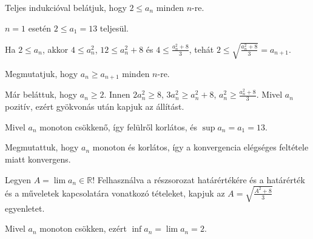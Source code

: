 \documentclass[11pt]{scrartcl}
\begin{document}
Teljes indukcióval belátjuk, hogy $2 \le a_n$ minden $n$-re.

$n = 1$ esetén $2 \le a_1 = 13$ teljesül.

Ha $2 \le a_n$, akkor $4 \le a_n^2$, $12 \le a_n^2 + 8$ és
$4 \le \frac{a_n^2 + 8}{3}$, tehát
\(
2 \le \sqrt{\frac{a_n^2 + 8}{3}} = a_{n + 1}
\).

Megmutatjuk, hogy $a_n \ge a_{n + 1}$ minden $n$-re.

Már beláttuk, hogy $a_n \ge 2$. Innen $2a_n^2 \ge 8$, $3a_n^2 \ge a_n^2 + 8$,
$a_n^2 \ge \frac{a_n^2 + 8}{3}$. Mivel $a_n$ pozitív, ezért gyökvonás után
kapjuk az állítást.

Mivel $a_n$ monoton csökkenő, így felülről korlátos, és
$\sup a_n = a_1 = 13$.

Megmutattuk, hogy $a_n$ monoton és korlátos, így a konvergencia elégséges
feltétele miatt konvergens.

Legyen $A = \lim a_n \in \mathbb{R}$! Felhasználva a részsorozat
határértékére és a határérték és a műveletek kapcsolatára vonatkozó
tételeket, kapjuk az \(A = \sqrt{\frac{A^2 + 8}{3}}\) egyenletet.

Mivel $a_n$ monoton csökken, ezért $\inf a_n = \lim a_n = 2$.
\end{document}
